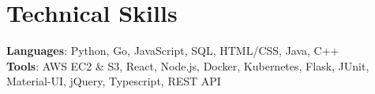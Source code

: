 \documentclass[letterpaper,11pt]{article}
\begin{document}
%
\section{Technical Skills}
 \begin{itemize}[leftmargin=0.15in, label={}]
    \small{\item{
     \textbf{Languages}{: Python, Go, JavaScript, SQL, HTML/CSS, Java, C++} \\
     \textbf{Tools}{: AWS EC2 \& S3, React, Node.js, Docker, Kubernetes, Flask, JUnit, Material-UI, jQuery, Typescript, REST API} \\
    }}
 \end{itemize}


\end{document}
